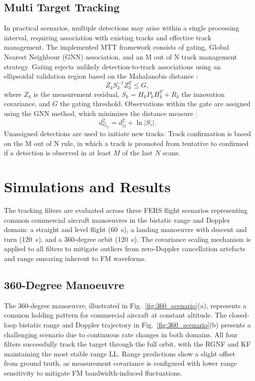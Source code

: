 \documentclass[conference,10pt,a4paper]{IEEEtran}%
\begin{document}
\subsection{Multi Target Tracking}  
In practical scenarios, multiple detections may arise within a single processing interval, requiring association with existing tracks and effective track management. The implemented MTT framework consists of gating, Global Nearest Neighbour (GNN) association, and an M out of N track management strategy. Gating rejects unlikely detection-to-track associations using an ellipsoidal validation region based on the Mahalanobis distance                         
\cite{Jerrelind2020,Richards2010}:
\begin{equation}                                 
  Z_k S_k^{-1} Z_k^T \leq G,
\end{equation}                                                                                                                      
where $Z_k$ is the measurement residual, $S_k = H_k P_k H_k^T + R_k$ the innovation covariance, and $G$ the gating threshold. Observations within the gate are assigned using the GNN method, which minimizes the distance measure \cite{Konstantinova2003}:
\begin{equation}
  d^2_{G_{ij}} = d^2_{ij} + \ln|S_i|.                          
\end{equation}                                                 
Unassigned detections are used to initiate new tracks. Track confirmation is based on the M out of N rule, in which a track is promoted from tentative to confirmed if a detection is observed in at least $M$ of the last $N$ scans.  

\section{Simulations and Results}
The tracking filters are evaluated across three FERS flight scenarios representing common commercial aircraft manoeuvres in
the bistatic range and Doppler domain: a straight and level flight (60~s), a landing manoeuvre with descent and turn (120~s), and a 360-degree orbit (120~s). The covariance scaling mechanism is applied to all filters to mitigate outliers from zero-Doppler cancellation artefacts and range smearing inherent to FM waveforms.

\subsection{360-Degree Manoeuvre}
The 360-degree manoeuvre, illustrated in Fig.~\ref{fig:360_scenario}(a), represents a common holding pattern for commercial aircraft at constant altitude. The closed-loop bistatic range and Doppler trajectory in Fig.~\ref{fig:360_scenario}(b) presents a challenging scenario due to continuous rate changes in both domains. All four   
filters successfully track the target through the full orbit, with the RGNF and KF maintaining the most stable range LL. Range predictions show a slight offset from ground truth, as measurement covariance is configured with lower range sensitivity to mitigate FM bandwidth-induced fluctuations.
\end{document}
